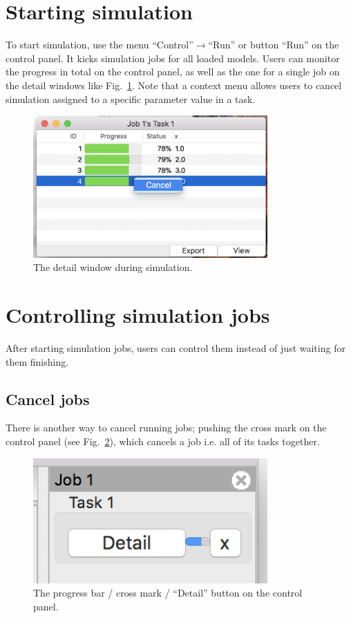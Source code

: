 \documentclass[a4paper,10pt]{report}
\begin{document}
\section{Starting simulation}
\label{sec:orgb3d6f6b}
To start simulation, use the menu ``Control''\(\to\)``Run'' or button
``Run'' on the control panel. It kicks simulation jobs for all loaded models.
Users can monitor the progress in total on the control panel, as well as the
one for a single job on the detail windows like Fig.~\ref{fig:org2762e54}.
Note that a context menu allows users to cancel simulation assigned to a
specific parameter value in a task.

\begin{figure}[htbp]
\centering
\includegraphics[width=0.8\textwidth]{image/lr-detail.png}
\caption{\label{fig:org2762e54}The detail window during simulation.}
\end{figure}

\section{Controlling simulation jobs}
\label{sec:org4c3eb66}
After starting simulation jobs, users can control them instead of just waiting
for them finishing.

\subsection{Cancel jobs}
\label{sec:org36692f0}
There is another way to cancel running jobs; pushing the cross mark on the
control panel (see Fig.~\ref{fig:orge3bea97}), which cancels a job i.e. all
of its tasks together.

\begin{figure}[htbp]
\centering
\includegraphics[width=0.8\textwidth]{image/lr-progress.png}
\caption{\label{fig:orge3bea97}The progress bar / cross mark / ``Detail'' button on the control panel.}
\end{figure}
\end{document}
